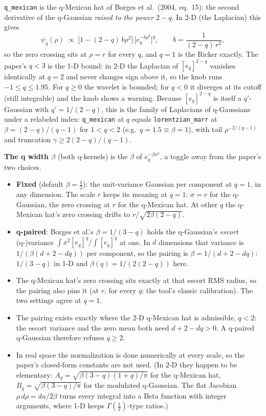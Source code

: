 \documentclass[10pt]{article}
\begin{document}
\texttt{q\_mexican} is the q-Mexican hat of Borges et al.\ (2004, eq.~15): the second
derivative of the q-Gaussian \emph{raised to the power $2-q$}. In 2-D (the Laplacian) this
gives
\[
  \psi_q(\rho)\;\propto\;\bigl[1-(2-q)\,b\rho^2\bigr]\,\bigl[e_q^{-b\rho^2}\bigr]^{q},
  \qquad b=\frac{1}{(2-q)\,r^2},
\]
so the zero crossing sits at $\rho=r$ for every $q$, and $q=1$ is the Ricker exactly. The
paper's $q<3$ is the 1-D bound: in 2-D the Laplacian of $[e_q]^{2-q}$ vanishes identically
at $q=2$ and never changes sign above it, so the knob runs $-1\le q\le1.95$. For $q\ge0$
the wavelet is bounded; for $q<0$ it diverges at its cutoff (still integrable) and the knob
shows a warning. Because $[e_q]^{2-q}$ is itself a $q'$-Gaussian with $q'=1/(2-q)$, this is
the family of Laplacians of q-Gaussians under a relabeled index: \texttt{q\_mexican} at $q$
equals \texttt{lorentzian\_marr} at $\beta=(2-q)/(q-1)$ for $1<q<2$ (e.g.\ $q=1.5\equiv\beta=1$),
with tail $\rho^{-2/(q-1)}$ and truncation $\gamma\ge2(2-q)/(q-1)$.

\textbf{The q width $\beta$} (both q-kernels) is the $\beta$ of $e_q^{-\beta x^2}$, a toggle away
from the paper's two choices.
\begin{itemize}\itemsep2pt
  \item \textbf{Fixed} (default $\beta=\tfrac12$): the unit-variance Gaussian per component at
        $q=1$, in any dimension. The scale $r$ keeps its meaning at $q=1$: $\sigma=r$ for the
        q-Gaussian, the zero crossing at $r$ for the q-Mexican hat. At other $q$ the q-Mexican
        hat's zero crossing drifts to $r/\sqrt{2\beta(2-q)}$.
  \item \textbf{q-paired}: Borges et al.'s $\beta=1/(3-q)$ holds the q-Gaussian's
        \emph{escort} (q-)variance $\int x^2[e_q]^q/\int[e_q]^q$ at one. In $d$ dimensions that
        variance is $1/(\beta(d+2-dq))$ per component, so the pairing is $\beta=1/(d+2-dq)$:
        $1/(3-q)$ in 1-D and $\beta(q)=1/(2(2-q))$ here.
  \item The q-Mexican hat's zero crossing sits exactly at that escort RMS radius, so the
        pairing also pins it (at $r$, for every $q$: the tool's classic calibration). The two
        settings agree at $q=1$.
  \item The pairing exists exactly where the 2-D q-Mexican hat is admissible, $q<2$: the
        escort variance and the zero mean both need $d+2-dq>0$. A q-paired q-Gaussian
        therefore refuses $q\ge2$.
  \item In real space the normalization is done numerically at every scale, so the paper's
        closed-form constants are not used. (In 2-D they happen to be elementary:
        $A_q=\sqrt{\beta(3-q)(1+q)/\pi}$ for the q-Mexican hat,
        $B_q=\sqrt{\beta(3-q)/\pi}$ for the modulated q-Gaussian. The flat Jacobian
        $\rho\,d\rho=du/2\beta$ turns every integral into a Beta function with integer
        arguments, where 1-D keeps $\Gamma(\tfrac12)$-type ratios.)
\end{itemize}
\end{document}
